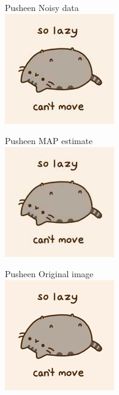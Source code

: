 \documentclass[10pt]{beamer}
\begin{document}
\begin{frame}{Pusheen}
\centering
Noisy data
\\
\includegraphics[height=40ex]{results/pusheen-tmp} 
\end{frame}
\begin{frame}{Pusheen}
\centering
MAP estimate\vphantom{y}
\\
\includegraphics[height=40ex]{results/pusheen-fixed}
\end{frame}
\begin{frame}{Pusheen}
\centering
Original image
\\
\includegraphics[height=40ex]{results/pusheen} 
\end{frame}
\end{document}
